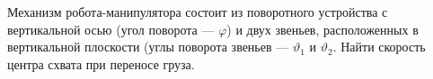 Механизм робота-манипулятора состоит из поворотного устройства с вертикальной
осью (угол поворота --- $\varphi$) и двух звеньев, расположенных в вертикальной
плоскости (углы поворота звеньев --- $\vartheta_1$ и $\vartheta_2$.
Найти скорость центра схвата при переносе груза.
